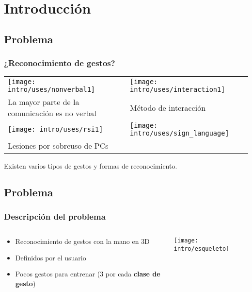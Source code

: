 
\section{Introducción} 

\subsection{Problema}


\begin{frame}
\frametitle{¿Reconocimiento de gestos?}
\centering
\begin{tabular}{C{0.5\linewidth}C{0.5\linewidth}}
\texttt{[image: intro/uses/nonverbal1]} & \texttt{[image: intro/uses/interaction1]} \\
La mayor parte de la comunicación es no verbal %
& Método de interacción\\
\texttt{[image: intro/uses/rsi1]} & \texttt{[image: intro/uses/sign\_language]}\\
Lesiones por sobreuso de PCs %
\end{tabular}

\begin{block}{}
Existen varios tipos de gestos y formas de reconocimiento. 
\end{block}
\end{frame}


\subsection{Problema}
\begin{myframe}
\frametitle{Descripción del problema}
\begin{columns}
    \begin{column}{0.5\textwidth}
        \begin{itemize}
        \item Reconocimiento de gestos con la mano en 3D
        \item Definidos por el usuario
        \item Pocos gestos para entrenar (3 por cada \textbf{clase de gesto})
        \end{itemize}
    \end{column}
    \begin{column}{0.5\textwidth}
    \texttt{[image: intro/esqueleto]}
    \end{column}
  \end{columns}
\end{myframe}


